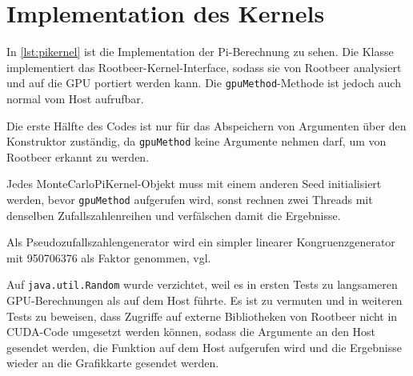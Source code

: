 \section{Implementation des Kernels}
\label{sct:kernelimplementation}

In \autoref{lst:pikernel} ist die Implementation der Pi-Berechnung zu sehen.
Die Klasse implementiert das Rootbeer-Kernel-Interface, sodass sie von Rootbeer analysiert und auf die GPU portiert werden kann.
Die \lstinline!gpuMethod!-Methode ist jedoch auch normal vom Host aufrufbar.

Die erste Hälfte des Codes ist nur für das Abspeichern von Argumenten über den Konstruktor zuständig, da \lstinline!gpuMethod! keine Argumente nehmen darf, um von Rootbeer erkannt zu werden.

Jedes MonteCarloPiKernel-Objekt muss mit einem anderen Seed initialisiert werden, bevor \lstinline!gpuMethod! aufgerufen wird, sonst rechnen zwei Threads mit denselben Zufallszahlenreihen und verfälschen damit die Ergebnisse.

Als Pseudozufallszahlengenerator wird ein simpler linearer Kongruenzgenerator mit 950706376 als Faktor genommen, vgl. \cite{fishman82,fishman86}

Auf \lstinline!java.util.Random! wurde verzichtet, weil es in ersten Tests zu langsameren GPU-Berechnungen als auf dem Host führte. Es ist zu vermuten und in weiteren Tests zu beweisen, dass Zugriffe auf externe Bibliotheken von Rootbeer nicht in CUDA-Code umgesetzt werden können, sodass die Argumente an den Host gesendet werden, die Funktion auf dem Host aufgerufen wird und die Ergebnisse wieder an die Grafikkarte gesendet werden.

